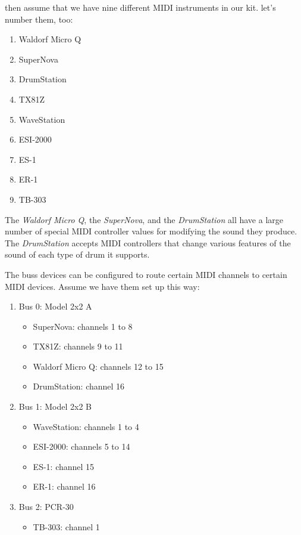    then assume that we have nine different MIDI instruments in our kit.
   let's number them, too:

   \begin{enumerate}
      \item Waldorf Micro Q
      \item SuperNova
      \item DrumStation
      \item TX81Z
      \item WaveStation
      \item ESI-2000
      \item ES-1
      \item ER-1
      \item TB-303
   \end{enumerate}

   The \textsl{Waldorf Micro Q},
   the \textsl{SuperNova},
   and the \textsl{DrumStation} all have a large
   number of special MIDI controller values for modifying the sound they
   produce.
   The \textsl{DrumStation} accepts MIDI controllers that change various
   features of the sound of each type of drum it supports.

   The buss devices can be configured to route certain
   MIDI channels to certain MIDI devices.  Assume we have them
   set up this way:

   \begin{enumerate}
      \item Bus 0: Model 2x2 A
      \begin{itemize}
         \item SuperNova: channels 1 to 8
         \item TX81Z: channels 9 to 11
         \item Waldorf Micro Q: channels 12 to 15
         \item DrumStation: channel 16
      \end{itemize}
      \item Bus 1: Model 2x2 B
      \begin{itemize}
         \item WaveStation: channels 1 to 4
         \item ESI-2000: channels 5 to 14
         \item ES-1: channel 15
         \item ER-1: channel 16
      \end{itemize}
      \item Bus 2: PCR-30
      \begin{itemize}
         \item TB-303: channel 1
      \end{itemize}
   \end{enumerate}

